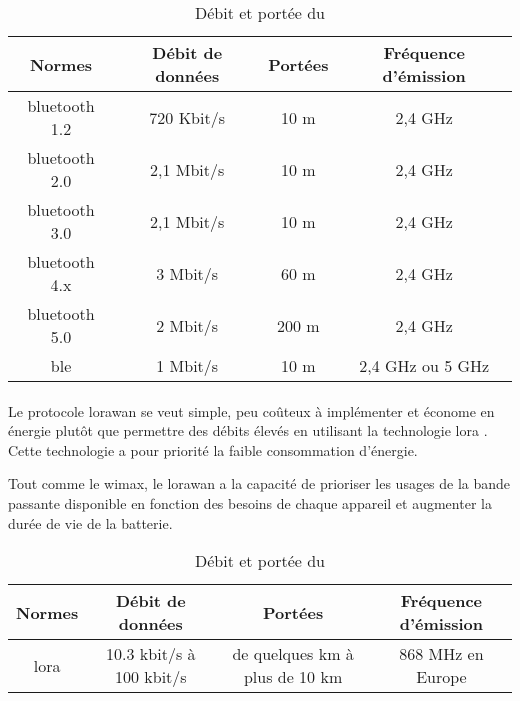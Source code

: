 \begin{table}[H]
    \centering
    \begin{tabular}{|c|c|c|c|}
        \hline
        \rowcolor{tableColorDark} Normes & Débit de données & Portées & Fréquence d'émission \\
        \hline

        \gls{bluetooth} 1.2              & 720 Kbit/s       & 10 m    & 2,4 GHz              \\\hline
        \gls{bluetooth} 2.0              & 2,1 Mbit/s       & 10 m    & 2,4 GHz              \\\hline
        \gls{bluetooth} 3.0              & 2,1 Mbit/s       & 10 m    & 2,4 GHz              \\\hline
        \gls{bluetooth} 4.x              & 3 Mbit/s         & 60 m    & 2,4 GHz              \\\hline
        \gls{bluetooth} 5.0              & 2 Mbit/s         & 200 m   & 2,4 GHz              \\\hline
        \gls{ble}                        & 1 Mbit/s         & 10 m    & 2,4 GHz ou 5 GHz     \\\hline
    \end{tabular}
    \label{tab:debitPorteeBluetooth}
    \caption{Débit et portée du }
    \nocite{ble}\nocite{debitPortee}
\end{table}

\paragraph{}
\label{sec:lorawan}

Le protocole \gls{lorawan} se veut simple, peu coûteux à implémenter et économe en énergie plutôt que permettre des débits élevés en
utilisant la technologie \gls{lora} \cite{lorawan}. Cette technologie a pour priorité la faible consommation d'énergie.\newline

Tout comme le \gls{wimax}, le \gls{lorawan} a la capacité de prioriser les usages de la bande passante disponible en fonction
des besoins de chaque appareil et augmenter la durée de vie de la batterie.

\begin{table}[H]
    \centering
    \begin{tabular}{|c|c|c|c|}
        \hline
        \rowcolor{tableColorDark} Normes & Débit de données         & Portées                        & Fréquence d'émission \\
        \hline

        \gls{lora}                       & 10.3 kbit/s à 100 kbit/s & de quelques km à plus de 10 km & 868 MHz en Europe    \\\hline
    \end{tabular}
    \label{tab:debitPorteeLora}
    \caption{Débit et portée du }
    \nocite{debitPortee}
\end{table}

